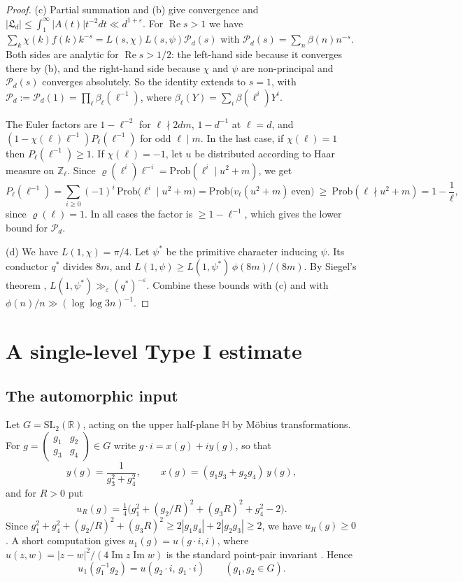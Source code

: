 \documentclass[11pt]{amsart}
\theoremstyle{remark}
\theoremstyle{definition}
\numberwithin{equation}{section}
\newcommand{\Z}{\mathbb{Z}}
\newcommand{\R}{\mathbb{R}}
\newcommand{\Hb}{\mathbb{H}}
\newcommand{\eps}{\varepsilon}
\newcommand{\Lf}{\mathfrak{L}}
\newcommand{\SL}{\mathrm{SL}}
\begin{document}
\begin{proof}
(c) Partial summation and (b) give convergence and $|\Lf_d|\le\int_1^\infty|A(t)|t^{-2}dt\ll d^{1+\eps}$. For $\operatorname{Re}s>1$ we have $\sum_k\chi(k)f(k)k^{-s}=L(s,\chi)L(s,\psi)\mathcal P_d(s)$ with $\mathcal P_d(s)=\sum_n\beta(n)n^{-s}$. Both sides are analytic for $\operatorname{Re}s>1/2$: the left-hand side because it converges there by (b), and the right-hand side because $\chi$ and $\psi$ are non-principal and $\mathcal P_d(s)$ converges absolutely. So the identity extends to $s=1$, with $\mathcal P_d:=\mathcal P_d(1)=\prod_\ell\beta_\ell(\ell^{-1})$, where $\beta_\ell(Y)=\sum_i\beta(\ell^i)Y^i$.

The Euler factors are $1-\ell^{-2}$ for $\ell\nmid2dm$, $1-d^{-1}$ at $\ell=d$, and $(1-\chi(\ell)\ell^{-1})P_\ell(\ell^{-1})$ for odd $\ell\mid m$. In the last case, if $\chi(\ell)=1$ then $P_\ell(\ell^{-1})\ge1$. If $\chi(\ell)=-1$, let $u$ be distributed according to Haar measure on $\Z_\ell$. Since $\varrho(\ell^i)\ell^{-i}=\mathrm{Prob}(\ell^i\mid u^2+m)$, we get
\[
P_\ell(\ell^{-1})=\sum_{i\ge0}(-1)^i\,\mathrm{Prob}\bigl(\ell^i\mid u^2+m\bigr)=\mathrm{Prob}\bigl(v_\ell(u^2+m)\ \text{even}\bigr)\ \ge\ \mathrm{Prob}(\ell\nmid u^2+m)=1-\frac1\ell,
\]
since $\varrho(\ell)=1$. In all cases the factor is $\ge1-\ell^{-1}$, which gives the lower bound for $\mathcal P_d$.

(d) We have $L(1,\chi)=\pi/4$. Let $\psi^*$ be the primitive character inducing $\psi$. Its conductor $q^*$ divides $8m$, and $L(1,\psi)\ge L(1,\psi^*)\,\phi(8m)/(8m)$. By Siegel's theorem \cite[Ch.~21]{Da}, $L(1,\psi^*)\gg_\eps(q^*)^{-\eps}$. Combine these bounds with (c) and with $\phi(n)/n\gg(\log\log 3n)^{-1}$.
\end{proof}

\section{A single-level Type I estimate}\label{sec:typeI}

\subsection{The automorphic input}
Let $G=\SL_2(\R)$, acting on the upper half-plane $\Hb$ by M\"obius transformations. For $g=\left(\begin{smallmatrix}g_1&g_2\\g_3&g_4\end{smallmatrix}\right)\in G$ write $g\cdot i=x(g)+iy(g)$, so that
\[
y(g)=\frac1{g_3^2+g_4^2},\qquad x(g)=(g_1g_3+g_2g_4)\,y(g),
\]
and for $R>0$ put
\[
u_R(g)=\tfrac14\bigl(g_1^2+(g_2/R)^2+(g_3R)^2+g_4^2-2\bigr).
\]
Since $g_1^2+g_4^2+(g_2/R)^2+(g_3R)^2\ge2|g_1g_4|+2|g_2g_3|\ge2$, we have $u_R(g)\ge0$. A short computation gives $u_1(g)=u(g\cdot i,i)$, where $u(z,w)=|z-w|^2/(4\operatorname{Im}z\operatorname{Im}w)$ is the standard point-pair invariant \cite[Ch.~1]{Iw}. Hence
\begin{equation}\label{eq:pointpair}
u_1(g_1^{-1}g_2)=u(g_2\cdot i,\,g_1\cdot i)\qquad(g_1,g_2\in G).
\end{equation}
\end{document}
